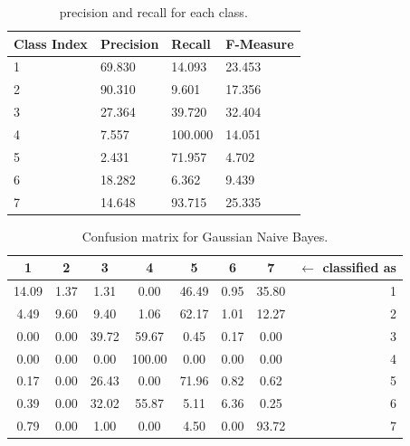 \documentclass[a4paper, 10pt]{article}
\begin{document}
\begin{table}[h!]
\centering
\begin{tabular}{|l|l|l|l|}
\hline
\textbf{Class Index} & \textbf{Precision} & \textbf{Recall} & \textbf{F-Measure}\\\hline
1 & 69.830 & 14.093& 23.453\\\hline
2 & 90.310 & 9.601& 17.356\\\hline
3 & 27.364 & 39.720& 32.404\\\hline
4 & 7.557 & 100.000& 14.051\\\hline
5 & 2.431 & 71.957& 4.702\\\hline
6 & 18.282 & 6.362& 9.439\\\hline
7 & 14.648 & 93.715& 25.335\\\hline
\end{tabular}
\caption{precision and recall for each class.}
\label{tab:gnb_test_pr}
\end{table}



\begin{table}[h!]
\centering
\begin{tabular}{|*{7}{c|}r|}
\hline

1 &2 &3 &4 &5 &6 &7 & $\leftarrow$ classified as \\\hline

\cellcolor{black!15}14.09 &1.37 &1.31 &0.00 &46.49 &0.95 &35.80 & 1 \\\hline

4.49 &\cellcolor{black!15}9.60 &9.40 &1.06 &62.17 &1.01 &12.27 & 2 \\\hline

0.00 &0.00 &\cellcolor{black!15}39.72 &59.67 &0.45 &0.17 &0.00 & 3 \\\hline

0.00 &0.00 &0.00 &\cellcolor{black!15}100.00 &0.00 &0.00 &0.00 & 4 \\\hline

0.17 &0.00 &26.43 &0.00 &\cellcolor{black!15}71.96 &0.82 &0.62 & 5 \\\hline

0.39 &0.00 &32.02 &55.87 &5.11 &\cellcolor{black!15}6.36 &0.25 & 6 \\\hline

0.79 &0.00 &1.00 &0.00 &4.50 &0.00 &\cellcolor{black!15}93.72 & 7 \\\hline

\end{tabular}
\caption{Confusion matrix for Gaussian Naive Bayes.}
\label{tab:gnb_cf}
\end{table}
\end{document}
